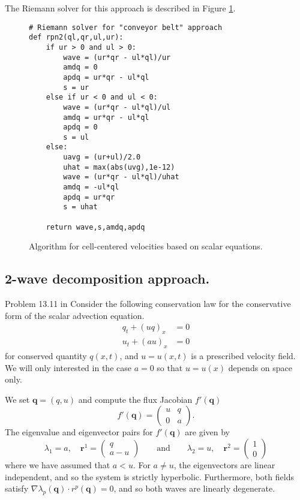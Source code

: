 \documentclass{article}
\newcommand{\Fig}[1]{Figure \ref{fig:#1}}
\begin{document}
The Riemann solver for this approach is described in \Fig{qstar}. 

\begin{figure}
\begin{center}
\begin{minipage}{0.5\textwidth}
\vspace{0.5cm}
\begin{verbatim}
# Riemann solver for "conveyor belt" approach
def rpn2(ql,qr,ul,ur):
    if ur > 0 and ul > 0:
        wave = (ur*qr - ul*ql)/ur
        amdq = 0
        apdq = ur*qr - ul*ql
        s = ur
    else if ur < 0 and ul < 0:
        wave = (ur*qr - ul*ql)/ul
        amdq = ur*qr - ul*ql
        apdq = 0
        s = ul
    else:
        uavg = (ur+ul)/2.0
        uhat = max(abs(uvg),1e-12)
        wave = (ur*qr - ul*ql)/uhat
        amdq = -ul*ql
        apdq = ur*qr
        s = uhat

    return wave,s,amdq,apdq
\end{verbatim}
\end{minipage}
\end{center}
\caption{Algorithm for cell-centered velocities based on scalar equations.}
\label{fig:qstar}
\end{figure}


\subsection{2-wave decomposition approach.}
Problem 13.11 in \cite{le:2002}
Consider the following conservation law for the conservative form of the scalar advection equation.
\begin{align}
q_t + (uq)_x &= 0 \\
u_t + (au)_x & = 0
\end{align}
for conserved quantity $q(x,t)$, and  $u = u(x,t)$ is a prescribed velocity field.  We will only 
interested in the case $a = 0$ so that $u = u(x)$ depends on space only.

We set $\mathbf q = (q,u)$ and compute the flux Jacobian $f'(\mathbf q)$
\begin{equation}
f'(\mathbf q) = \left(\begin{array}{rr} u & q \\ 0 & a\end{array}\right).
\end{equation}
The eigenvalue and eigenvector pairs for $f'(\mathbf q)$ are given by
\begin{equation}
\lambda_1 = a,  \quad  {\mathbf r}^1 = \left(\begin{array}{c} q \\ a-u\end{array}\right) \qquad \mbox{and} \qquad
\lambda_2 = u,  \quad  {\mathbf r}^2 = \left(\begin{array}{c} 1 \\ 0\end{array}\right)
\end{equation}
where we have assumed that $a < u$.  For $a \ne u$, the eigenvectors are linear independent, and so the system is strictly hyperbolic.  Furthermore, both fields satisfy $\nabla \lambda_p(\mathbf q) \cdot r^p(\mathbf q) = 0$, and so both waves are linearly degenerate.  
\end{document}
